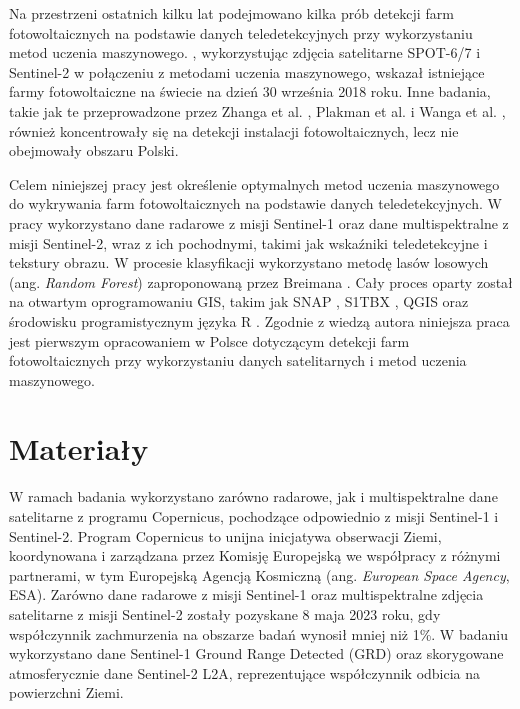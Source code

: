\documentclass{amuthesis}
\begin{document}
Na przestrzeni ostatnich kilku lat podejmowano kilka prób detekcji farm
fotowoltaicznych na podstawie danych teledetekcyjnych przy wykorzystaniu
metod uczenia maszynowego. \textcite{kruitwagen_2021_pv}, wykorzystując
zdjęcia satelitarne SPOT-6/7 i Sentinel-2 w połączeniu z metodami
uczenia maszynowego, wskazał istniejące farmy fotowoltaiczne na świecie
na dzień 30 września 2018 roku. Inne badania, takie jak te
przeprowadzone przez Zhanga et al. \autocite*{zhang_2021_texture},
Plakman et al. \autocite*{plakman_2022_pv} i Wanga et al.
\autocite*{wang_2022_pv}, również koncentrowały się na detekcji
instalacji fotowoltaicznych, lecz nie obejmowały obszaru Polski.

Celem niniejszej pracy jest określenie optymalnych metod uczenia
maszynowego do wykrywania farm fotowoltaicznych na podstawie danych
teledetekcyjnych. W pracy wykorzystano dane radarowe z misji Sentinel-1
oraz dane multispektralne z misji Sentinel-2, wraz z ich pochodnymi,
takimi jak wskaźniki teledetekcyjne i tekstury obrazu. W procesie
klasyfikacji wykorzystano metodę lasów losowych (ang. \emph{Random
Forest}) zaproponowaną przez Breimana \autocite*{breiman_2001_rf}. Cały
proces oparty został na otwartym oprogramowaniu GIS, takim jak SNAP
\autocite{snap}, S1TBX \autocite{s1tbx}, QGIS \autocite{qgis} oraz
środowisku programistycznym języka R \autocite{R-base}. Zgodnie z wiedzą
autora niniejsza praca jest pierwszym opracowaniem w Polsce dotyczącym
detekcji farm fotowoltaicznych przy wykorzystaniu danych satelitarnych i
metod uczenia maszynowego.


\hypertarget{sec-materialy}{%
\chapter{Materiały}\label{sec-materialy}}

W ramach badania wykorzystano zarówno radarowe, jak i multispektralne
dane satelitarne z programu Copernicus, pochodzące odpowiednio z misji
Sentinel-1 i Sentinel-2. Program Copernicus to unijna inicjatywa
obserwacji Ziemi, koordynowana i zarządzana przez Komisję Europejską we
współpracy z różnymi partnerami, w tym Europejską Agencją Kosmiczną
(ang. \emph{European Space Agency}, ESA). Zarówno dane radarowe z misji
Sentinel-1 oraz multispektralne zdjęcia satelitarne z misji Sentinel-2
zostały pozyskane 8 maja 2023 roku, gdy współczynnik zachmurzenia na
obszarze badań wynosił mniej niż 1\%. W badaniu wykorzystano dane
Sentinel-1 Ground Range Detected (GRD) oraz skorygowane atmosferycznie
dane Sentinel-2 L2A, reprezentujące współczynnik odbicia na powierzchni
Ziemi.
\end{document}
